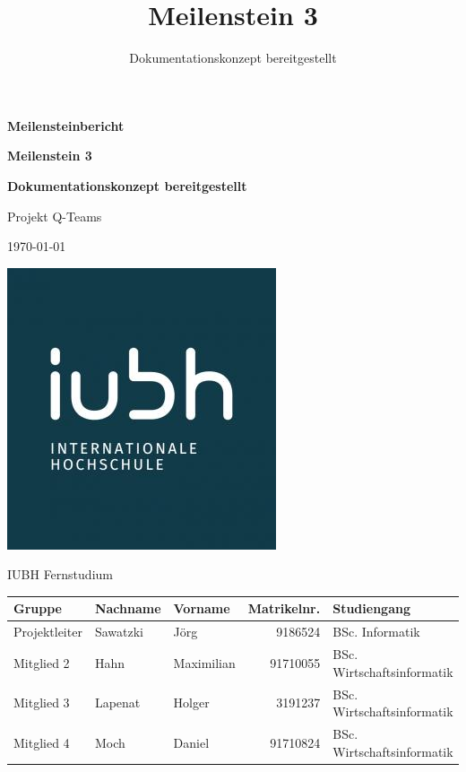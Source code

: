\documentclass[a4paper,11pt,listof=numbered,glossary=totoc,parskip=half,toc=bib]{scrreprt}
\title{Meilenstein 3}
\subtitle{Dokumentationskonzept bereitgestellt}
\begin{document}
	\begin{titlepage}
		
		\centering
		\vspace*{2.5cm}
		{\large\bfseries Meilensteinbericht\par}	
		{\Huge\bfseries Meilenstein 3\par}
		{\Large\bfseries Dokumentationskonzept bereitgestellt\par}

		{\Large Projekt Q-Teams\par}
		{\large\today\par}
		\vspace{0.5cm}

			
		
		\includegraphics[scale=0.5]{iubh_logo}
		
		IUBH Fernstudium
		\vspace{0.5cm}
		
		\begin{tabular}{lllrl}
			\toprule
			\textbf{Gruppe} & \textbf{Nachname} & \textbf{Vorname} & \textbf{Matrikelnr.} & \textbf{Studiengang} \\
			\midrule
			Projektleiter & Sawatzki & Jörg & 9186524 & BSc. Informatik \\
			Mitglied 2 & Hahn & Maximilian & 91710055 & BSc. Wirtschaftsinformatik \\
			Mitglied 3 & Lapenat & Holger & 3191237 & BSc. Wirtschaftsinformatik \\
			Mitglied 4 & Moch & Daniel & 91710824 & BSc. Wirtschaftsinformatik \\
			\bottomrule
		\end{tabular}	
	\end{titlepage}
	
\end{document}
